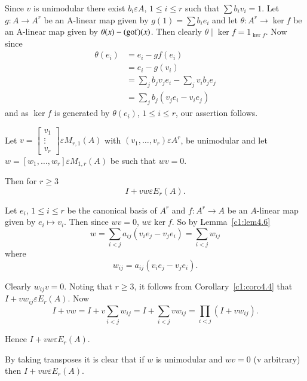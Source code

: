 \begin{Proof}
Since $v$ is unimodular there exist $b_i\varepsilon A$, $1\leq i \leq
r$ such that $\sum b_iv_i=1$. Let $g:A\rightarrow A^{r}$ be an
A-linear map given by $g(1)=\sum b_ie_i$ and let
$\theta:A^{r}\rightarrow \ker f$ be an A-linear map given by
$\theta(x)-(\mathrm{gof})(x)$. Then clearly $\theta \mid \ker f=1_{\ker
  f}$. Now since
\begin{align*}
\theta(e_i) &= e_i-gf(e_i)\\
&=e_i-g(v_i)\\
&=\sum\limits_{j}b_jv_je_i-\sum\limits_{j}v_ib_je_j\\
&=\sum\limits_{j}b_j(v_je_i-v_ie_j)
\end{align*}
and as $\ker f$ is generated by $\theta(e_i)$, $1\leq i\leq r$, our
assertion follows.
\enprf
\end{Proof}

\begin{Prop}\label{c1:Prop4.7}
Let $v=\begin{bmatrix}
v_1\\
\vdots\\
v_r
\end{bmatrix} \varepsilon M_{r,1}(A)$ with $(v_1,\ldots,v_r)
\varepsilon A^{r}$, be unimodular and let $w=[w_1,\ldots,w_r]
\varepsilon M_{1,r}(A)$ be such that $wv=0$. 

Then for $r\geq 3$
$$
I+vw\varepsilon E_r(A).
$$
\end{Prop}


\begin{Proof}
Let $e_i$, $1\leq i \leq r$ be the canonical basis of $A^{r}$ and
$f:A^{r}\rightarrow A$ be an $A$-linear map given by $e_i\mapsto
v_i$. Then since $wv=0$, $w\varepsilon \ker f$. So by
Lemma~\ref{c1:lem4.6}
$$
w=\sum\limits_{i<j}a_{ij}(v_ie_j-v_je_i)=\sum\limits_{i<j}w_{ij}
$$
where
$$
w_{ij}=a_{ij}(v_ie_j-v_je_i).
$$

Clearly $w_{ij}v=0$. Noting that $r\geq 3$, it follows from
Corollary~\ref{c1:coro4.4} that $I+vw_{ij}\varepsilon E_r(A)$. Now 
$$
I+vw=I+v\sum\limits_{i<j}w_{ij}=I+\sum\limits_{i<j}vw_{ij}= \prod\limits_{i<j}(I+vw_{ij}).
$$

Hence $I+vw \varepsilon E_r(A)$.
\enprf
\end{Proof}

\begin{rem}\label{c1:rem4.8}
By taking transposes it is clear that if $w$ is unimodular and $wv=0$
(v arbitrary) then $I+vw\varepsilon E_r(A)$. 
\end{rem}

